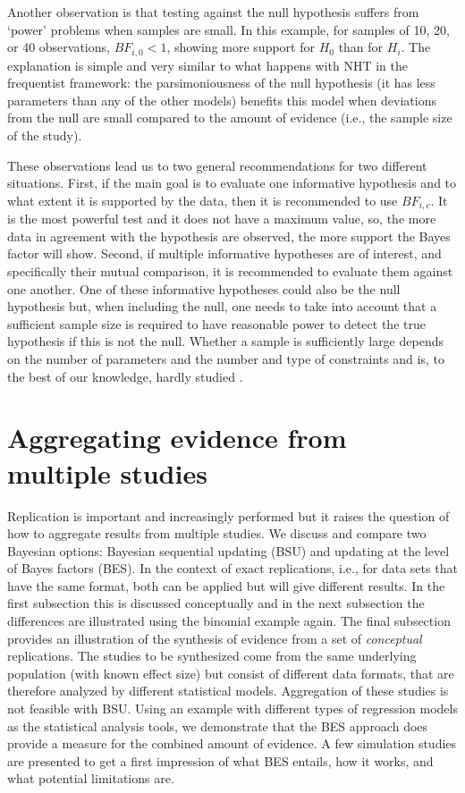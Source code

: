 \documentclass[11pt,reqno]{article}
\begin{document}
Another observation is that testing against the null hypothesis suffers from `power' problems when samples are small. In this example, for samples of 10, 20, or 40 observations, $BF_{i,0} < 1$, showing more support for $H_0$ than for $H_i$. The explanation is simple and very similar to what happens with NHT in the frequentist framework: the parsimoniousness of the null hypothesis (it has less parameters than any of the other models) benefits this model when deviations from the null are small compared to the amount of evidence (i.e., the sample size of the study).

These observations lead us to two general recommendations for two different situations. First, if the main goal is to evaluate one informative hypothesis and to what extent it is supported by the data, then it is recommended to use $BF_{i,c}$. It is the most powerful test and it does not have a maximum value, so, the more data in agreement with the hypothesis are observed, the more support the Bayes factor will show. Second, if multiple informative hypotheses are of interest, and specifically their mutual comparison, it is recommended to evaluate them against one another. One of these informative hypotheses could also be the null hypothesis but, when including the null, one needs to take into account that a sufficient sample size is required to have reasonable power to detect the true hypothesis if this is not the null. Whether a sample is sufficiently large depends on the number of parameters and the number and type of constraints and is, to the best of our knowledge, hardly studied \autocite[for an exception in the context of comparing 2 means, see][]{fu_sample_2021}.



\section{Aggregating evidence from multiple studies}\label{Multiple}

Replication is important and increasingly performed but it raises the question of how to aggregate results from multiple studies. We discuss and compare two Bayesian options: Bayesian sequential updating (BSU) and updating at the level of Bayes factors (BES). In the context of exact replications, i.e., for data sets that have the same format, both can be applied but will give different results. In the first subsection this is discussed conceptually and in the next subsection the differences are illustrated using the binomial example again. The final subsection provides an illustration of the synthesis of evidence from a set of \textit{conceptual} replications. The studies to be synthesized come from the same underlying population (with known effect size) but consist of different data formats, that are therefore analyzed by different statistical models. Aggregation of these studies is not feasible with BSU. Using an example with different types of regression models as the statistical analysis tools, we demonstrate that the BES approach does provide a measure for the combined amount of evidence. A few simulation studies are presented to get a first impression of what BES entails, how it works, and what potential limitations are.
\end{document}
